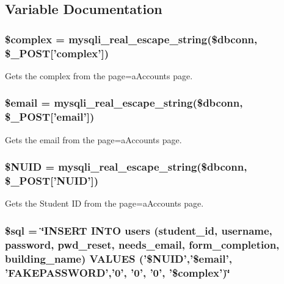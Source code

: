 \subsection{\-Variable \-Documentation}
\hypertarget{userVal_8php_a25ec02534214977602829622b78b5d78}{
\subsubsection[{\$complex}]{\setlength{\rightskip}{0pt plus 5cm}\$complex = mysqli\-\_\-real\-\_\-escape\-\_\-string(\$dbconn, \$\-\_\-\-P\-O\-S\-T\mbox{[}'complex'\mbox{]})}}\label{userVal_8php_a25ec02534214977602829622b78b5d78}
\-Gets the complex from the page=a\-Accounts page. \hypertarget{userVal_8php_ad634f418b20382e2802f80532d76d3cd}{
\subsubsection[{\$email}]{\setlength{\rightskip}{0pt plus 5cm}\$email = mysqli\-\_\-real\-\_\-escape\-\_\-string(\$dbconn, \$\-\_\-\-P\-O\-S\-T\mbox{[}'email'\mbox{]})}}\label{userVal_8php_ad634f418b20382e2802f80532d76d3cd}
\-Gets the email from the page=a\-Accounts page. \hypertarget{userVal_8php_a1a24d1e88ff0d48685fff9c620e4ad9e}{
\subsubsection[{\$\-N\-U\-I\-D}]{\setlength{\rightskip}{0pt plus 5cm}\$\-N\-U\-I\-D = mysqli\-\_\-real\-\_\-escape\-\_\-string(\$dbconn, \$\-\_\-\-P\-O\-S\-T\mbox{[}'\-N\-U\-I\-D'\mbox{]})}}\label{userVal_8php_a1a24d1e88ff0d48685fff9c620e4ad9e}
\-Gets the \-Student \-I\-D from the page=a\-Accounts page. \hypertarget{userVal_8php_a047170d6020a882807665812a27e2525}{
\subsubsection[{\$sql}]{\setlength{\rightskip}{0pt plus 5cm}\$sql = \char`\"{}\-I\-N\-S\-E\-R\-T \-I\-N\-T\-O users (student\-\_\-id, username, password, pwd\-\_\-reset, needs\-\_\-email, form\-\_\-completion, building\-\_\-name) \-V\-A\-L\-U\-E\-S ('\$\-N\-U\-I\-D','\$email', '\-F\-A\-K\-E\-P\-A\-S\-S\-W\-O\-R\-D','0', '0', '0', '\$complex')\char`\"{}}}\label{userVal_8php_a047170d6020a882807665812a27e2525}
